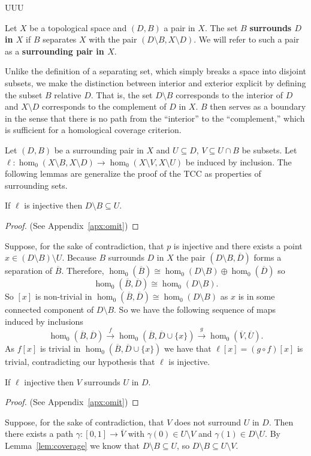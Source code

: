 UUU%

Let $X$ be a topological space and $(D,B)$ a pair in $X$.
The set $B$ \textbf{surrounds $D$ in $X$} if $B$ separates $X$ with the pair $(D\setminus B, X\setminus D)$.
We will refer to such a pair as a \textbf{surrounding pair in $X$}.

Unlike the definition of a separating set, which simply breaks a space into disjoint subsets, we make the distinction between interior and exterior explicit by defining the subset $B$ relative $D$.
That is, the set $D\setminus B$ corresponds to the interior of $D$ and $X\setminus D$ corresponds to the complement of $D$ in $X$.
$B$ then serves as a boundary in the sense that there is no path from the ``interior'' to the ``complement,'' which is sufficient for a homological coverage criterion.

Let $(D, B)$ be a surrounding pair in $X$ and $U\subseteq D$, $V\subseteq U\cap B$ be subsets.
Let $\ell: \hom_0(X\setminus B, X\setminus D)\to \hom_0(X\setminus V, X\setminus U)$ be induced by inclusion.
The following lemmas are generalize the proof of the TCC as properties of surrounding sets.

\begin{lemma}\label{lem:coverage}
  If $\ell$ is injective then $D\setminus B\subseteq U$.
\end{lemma}
\begin{proof}
  (See Appendix~\ref{apx:omit})
\end{proof}
\proofatend
    Suppose, for the sake of contradiction, that $p$ is injective and there exists a point $x\in (D\setminus B)\setminus U$.
    Because $B$ surrounds $D$ in $X$ the pair $(D\setminus B, \overline{D})$ forms a separation of $\overline{B}$.
    Therefore, $\hom_0(\overline{B})\cong \hom_0(D\setminus B)\oplus \hom_0(\overline{D})$ so
    \[ \hom_0(\overline{B}, \overline{D})\cong \hom_0(D\setminus B). \]
    So $[x]$ is non-trivial in $\hom_0(\overline{B},\overline{D})\cong \hom_0(D\setminus B)$ as $x$ is in some connected component of $D\setminus B$.
    So we have the following sequence of maps induced by inclusions
    \[ \hom_0(\overline{B},\overline{D})\xrightarrow{f} \hom_0(\overline{B},\overline{D}\cup\{x\})\xrightarrow{g} \hom_0(\overline{V},\overline{U}).\]
    As $f[x]$ is trivial in $\hom_0(\overline{B},\overline{D}\cup\{x\})$ we have that $\ell[x] = (g\circ f)[x]$ is trivial, contradicting our hypothesis that $\ell$ is injective.
\endproofatend

\begin{lemma}\label{lem:cov_surrounds}
  If $\ell$ injective then $V$ surrounds $U$ in $D$.
\end{lemma}
\begin{proof}
  (See Appendix~\ref{apx:omit})
\end{proof}
\proofatend
  Suppose, for the sake of contradiction, that $V$ does not surround $U$ in $D$.
  Then there exists a path $\gamma : [0,1]\to\overline{V}$ with $\gamma(0)\in U\setminus V$ and $\gamma(1)\in D\setminus U$.
  By Lemma~\ref{lem:coverage} we know that $D\setminus B\subseteq U$, so $D\setminus B\subseteq U\setminus V$.

